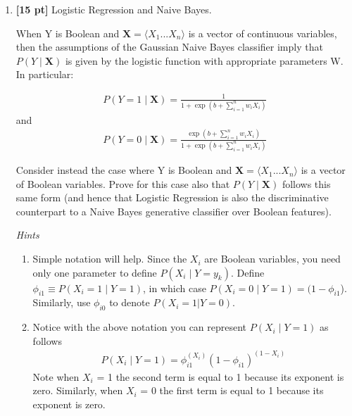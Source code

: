 \documentclass[12pt]{article}
\newcommand{\Xv}{\mathbf{X}}
\begin{document}
\begin{enumerate}
\clearpage

\item \textbf{[15 pt]} Logistic Regression and Naive Bayes. 

When Y is Boolean and $\Xv = \langle{X_{1}...X_{n}}\rangle$ is a vector of continuous variables, then the assumptions of the Gaussian Naive Bayes classifier imply that $P(Y \mid \Xv)$ is given by the logistic function with
appropriate parameters W. In particular:

\begin{align*}
    P(Y=1\mid\Xv)=\frac{1}{1+\exp(b+\sum_{i=1}^{n} w_iX_i)}
\end{align*}
and
\begin{align*}
    P(Y=0\mid\Xv)=\frac{\exp(b+\sum_{i=1}^{n} w_iX_i)}{1+\exp(b+\sum_{i=1}^{n} w_iX_i)}
\end{align*}

 Consider instead the case where Y is Boolean and ${\Xv = \langle{X_{1}...X_{n}}}\rangle$ is a vector
of Boolean variables. Prove for this case also that $P(Y\mid\Xv)$ follows this same form (and hence that Logistic Regression is also the discriminative
counterpart to a Naive Bayes generative classifier over Boolean features).

\emph{Hints}
\begin{enumerate}
    \item Simple notation will help. Since the $X_{i}$ are Boolean variables, you need only one parameter to define $P(X_{i}\mid{Y} = y_k)$. Define $\phi_{i1} \equiv P(X_{i} = 1\mid{Y = 1})$, in which case $P(X_{i} = 0\mid{Y = 1}) = (1-\phi_{i1}$). Similarly, use $\phi_{i0}$ to denote $P(X_{i} = 1|Y = 0)$.
    \item Notice with the above notation you can represent $P(X_i\mid{Y = 1})$ as follows
\begin{align*}
       P(X_{i}\mid{Y = 1}) = \phi_{i1}^{(X_i)}(1-\phi_{i1})^{(1-X_i)}
\end{align*}
    Note when $X_{i}$ = 1 the second term is equal to 1 because its exponent is zero. Similarly, when $X_{i}$ = 0 the first term is equal to 1 because its exponent is zero.\vspace{1cm}
    

\end{enumerate}
\end{enumerate}
\end{document}
